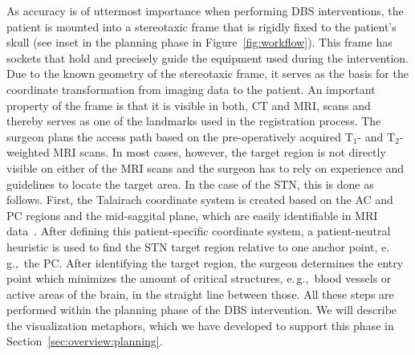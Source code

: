 \documentclass{vgtc}                          %
\begin{document}
%
%
As accuracy is of uttermost importance when performing DBS interventions, the patient is mounted into a stereotaxic frame that is rigidly fixed to the patient's skull (see inset in the planning phase in Figure~\ref{fig:workflow}). This frame has sockets that hold and precisely guide the equipment used during the intervention. Due to the known geometry of the stereotaxic frame, it serves as the basis for the coordinate transformation from imaging data to the patient. An important property of the frame is that it is visible in both, CT and MRI, scans and thereby serves as one of the landmarks used in the registration process. The surgeon plans the access path based on the pre-operatively acquired T$_1$- and T$_2$- weighted MRI scans. In most cases, however, the target region is not directly visible on either of the MRI scans and the surgeon has to rely on experience and guidelines to locate the target area. In the case of the STN, this is done as follows. First, the Talairach coordinate system is created based on the AC and PC regions and the mid-saggital plane, which are easily identifiable in MRI data~\cite{Talairach1993}. After defining this patient-specific coordinate system, a patient-neutral heuristic is used to find the STN target region relative to one anchor point, e.\,g.,~the PC. After identifying the target region, the surgeon determines the entry point which minimizes the amount of critical structures, e.\,g.,~blood vessels or active areas of the brain, in the straight line between those. All these steps are performed within the planning phase of the DBS intervention. We will describe the visualization metaphors, which we have developed to support this phase in Section~\ref{sec:overview:planning}.
\end{document}
